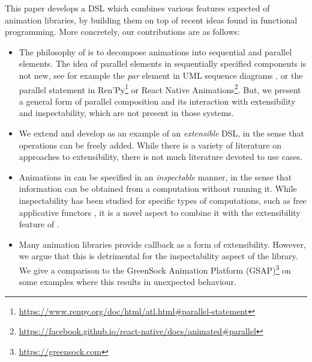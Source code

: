 This paper develops a DSL which combines various features expected of animation libraries, by building them on top of recent ideas found in functional programming. More concretely, our contributions are as follows:
\begin{itemize}
\item The philosophy of \dsl{} is to decompose animations into sequential and parallel elements. The idea of parallel elements in sequentially specified components is not new, see for example the \emph{par} element in UML sequence diagrams \cite{umlspec}, or the parallel statement in Ren'Py\footnote{\url{https://www.renpy.org/doc/html/atl.html#parallel-statement}} or React Native Animations\footnote{\url{https://facebook.github.io/react-native/docs/animated#parallel}}. But, we present a general form of parallel composition and its interaction with extensibility and inspectability, which are not present in those systems.
\item We extend and develop \dsl{} as an example of an \emph{extensible} DSL, in the sense that operations can be freely added. While there is a variety of literature on approaches to extensibility, there is not much literature devoted to use cases.
\item Animations in \dsl{} can be specified in an \emph{inspectable} manner, in the sense that information can be obtained from a computation without running it. While inspectability has been studied for specific types of computations, such as free applicative functors \cite{DBLP:journals/corr/CapriottiK14}, it is a novel aspect to combine it with the extensibility feature of \dsl{}.
\item Many animation libraries provide callback as a form of extensibility. However, we argue that this is detrimental for the inspectability aspect of the library. We give a comparison to the GreenSock Animation Platform (GSAP)\footnote{\url{https://greensock.com}} on some examples where this results in unexpected behaviour.
\end{itemize}
